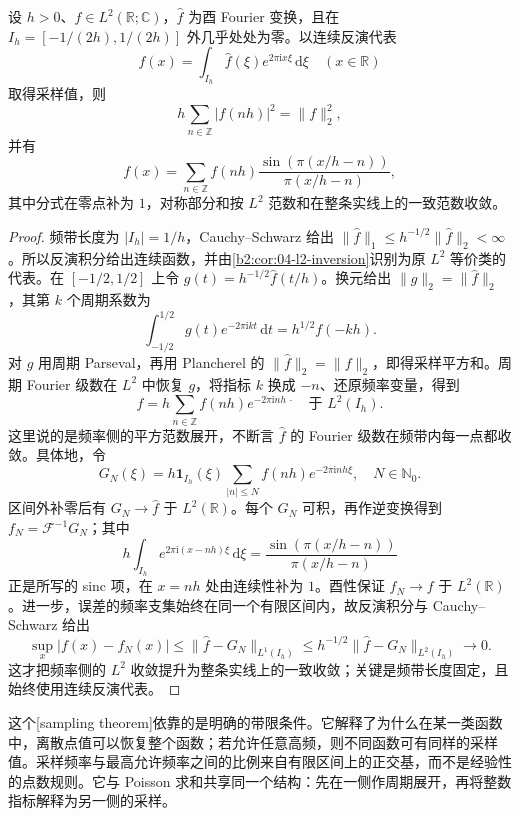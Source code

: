 \begin{theorem}[带限采样]\label{b2:thm:06-sampling}
设 \(h>0\)、\(f\in L^2(\mathbb R;\mathbb C)\)，\(\widehat f\) 为酉 Fourier 变换，且在 \(I_h=[-1/(2h),1/(2h)]\) 外几乎处处为零。以连续反演代表
\[
 f(x)=\int_{I_h}\widehat f(\xi)e^{2\pi\mathrm{i}x\xi}\,\mathrm{d}\xi
 \quad(x\in\mathbb R)
\]
取得采样值，则
\[
 h\sum_{n\in\mathbb Z}|f(nh)|^2=\|f\|_2^2,
\]
并有
\[
 f(x)=\sum_{n\in\mathbb Z}f(nh)
 \dfrac{\sin(\pi(x/h-n))}{\pi(x/h-n)},
\]
其中分式在零点补为 \(1\)，对称部分和按 \(L^2\) 范数和在整条实线上的一致范数收敛。
\end{theorem}
\begin{proof}
频带长度为 \(|I_h|=1/h\)，Cauchy--Schwarz 给出 \(\|\widehat f\|_1\leq h^{-1/2}\|\widehat f\|_2<\infty\)。所以反演积分给出连续函数，并由\cref{b2:cor:04-l2-inversion}识别为原 \(L^2\) 等价类的代表。在 \([-1/2,1/2]\) 上令 \(g(t)=h^{-1/2}\widehat f(t/h)\)。换元给出 \(\|g\|_2=\|\widehat f\|_2\)，其第 \(k\) 个周期系数为
\[
 \int_{-1/2}^{1/2}g(t)e^{-2\pi\mathrm{i}kt}\,\mathrm{d}t
 =h^{1/2}f(-kh).
\]
对 \(g\) 用周期 Parseval，再用 Plancherel 的 \(\|\widehat f\|_2=\|f\|_2\)，即得采样平方和。周期 Fourier 级数在 \(L^2\) 中恢复 \(g\)，将指标 \(k\) 换成 \(-n\)、还原频率变量，得到
\[
 \widehat f
 =h\sum_{n\in\mathbb Z}f(nh)e^{-2\pi\mathrm{i}nh\,\cdot}
 \quad\text{于 }L^2(I_h).
\]
这里说的是频率侧的平方范数展开，不断言 \(\widehat f\) 的 Fourier 级数在频带内每一点都收敛。具体地，令
\[
 G_N(\xi)=h\mathbf1_{I_h}(\xi)
          \sum_{|n|\leq N}f(nh)e^{-2\pi\mathrm{i}nh\xi},
 \quad N\in\mathbb N_0.
\]
区间外补零后有 \(G_N\to\widehat f\) 于 \(L^2(\mathbb R)\)。每个 \(G_N\) 可积，再作逆变换得到 \(f_N=\mathcal F^{-1}G_N\)；其中
\[
 h\int_{I_h}e^{2\pi\mathrm{i}(x-nh)\xi}\,\mathrm{d}\xi
 =\frac{\sin(\pi(x/h-n))}{\pi(x/h-n)}
\]
正是所写的 sinc 项，在 \(x=nh\) 处由连续性补为 \(1\)。酉性保证 \(f_N\to f\) 于 \(L^2(\mathbb R)\)。进一步，误差的频率支集始终在同一个有限区间内，故反演积分与 Cauchy--Schwarz 给出
\[
 \sup_x|f(x)-f_N(x)|
 \leq\|\widehat f-G_N\|_{L^1(I_h)}
 \leq h^{-1/2}\|\widehat f-G_N\|_{L^2(I_h)}\longrightarrow0.
\]
这才把频率侧的 \(L^2\) 收敛提升为整条实线上的一致收敛；关键是频带长度固定，且始终使用连续反演代表。
\end{proof}

这个[sampling theorem]依靠的是明确的带限条件。它解释了为什么在某一类函数中，离散点值可以恢复整个函数；若允许任意高频，则不同函数可有同样的采样值。采样频率与最高允许频率之间的比例来自有限区间上的正交基，而不是经验性的点数规则。它与 Poisson 求和共享同一个结构：先在一侧作周期展开，再将整数指标解释为另一侧的采样。

